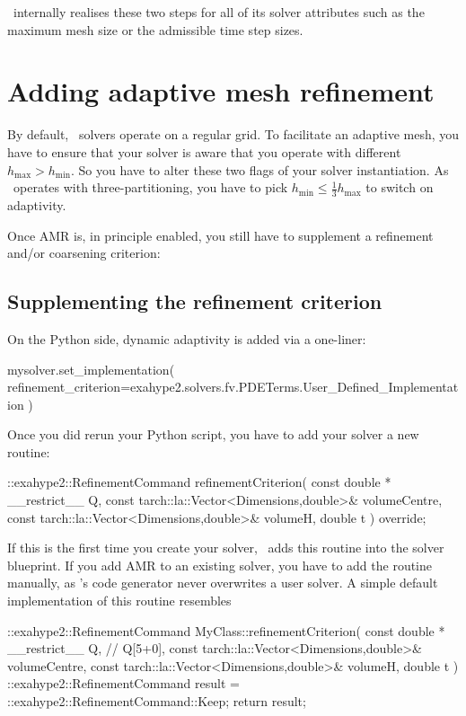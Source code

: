 \ExaHyPE\ internally realises these two steps for all of its solver attributes
such as the maximum mesh size or the admissible time step sizes.


\section{Adding adaptive mesh refinement}

By default, \ExaHyPE\ solvers operate on a regular grid.
To facilitate an adaptive mesh, you have to ensure that your solver is aware that you operate 
with different $h_{\text{max}}>h_{\text{min}}$. 
So you have to alter these two flags of your solver instantiation.
As \Peano\ operates with three-partitioning, you have to pick 
$h_{\text{min}} \leq \frac{1}{3} h_{\text{max}}$ to switch on adaptivity.

Once AMR is, in principle enabled, you still have to supplement a refinement and/or coarsening criterion:



\subsection{Supplementing the refinement criterion}

On the Python side, dynamic adaptivity is added via a one-liner:

\begin{code}
mysolver.set_implementation(
 refinement_criterion=exahype2.solvers.fv.PDETerms.User_Defined_Implementation 
)
\end{code}


\noindent
Once you did rerun your Python script, you have to add your solver a new
routine:

\begin{code}
::exahype2::RefinementCommand refinementCriterion(
  const double * __restrict__ Q,
  const tarch::la::Vector<Dimensions,double>&  volumeCentre,
  const tarch::la::Vector<Dimensions,double>&  volumeH,
  double                                       t
) override;
\end{code}


\noindent
If this is the first time you create your solver, \ExaHyPE\ adds this routine
into the solver blueprint.
If you add AMR to an existing solver, you have to add the routine manually, as
\ExaHyPE's code generator never overwrites a user solver.
A simple default implementation of this routine resembles

\begin{code}
::exahype2::RefinementCommand MyClass::refinementCriterion(
  const double * __restrict__ Q, // Q[5+0],
  const tarch::la::Vector<Dimensions,double>&  volumeCentre,
  const tarch::la::Vector<Dimensions,double>&  volumeH,
  double                                       t
) {
  ::exahype2::RefinementCommand result = ::exahype2::RefinementCommand::Keep;
  return result;
}
\end{code}


